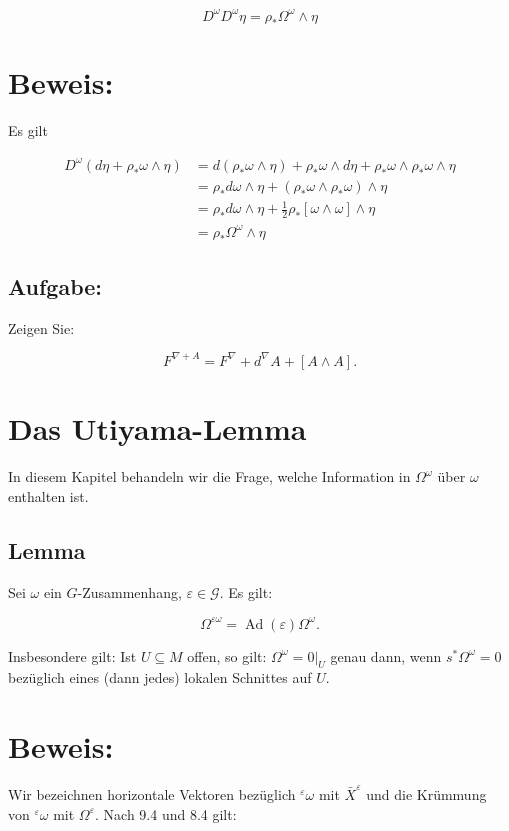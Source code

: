 \documentclass[10pt, letterpaper]{article}
\begin{document}
$$
D^{\omega} D^{\omega} \eta=\rho_{*} \Omega^{\omega} \wedge \eta
$$

\section*{Beweis:}
Es gilt

$$
\begin{aligned}
D^{\omega}\left(d \eta+\rho_{*} \omega \wedge \eta\right) & =d\left(\rho_{*} \omega \wedge \eta\right)+\rho_{*} \omega \wedge d \eta+\rho_{*} \omega \wedge \rho_{*} \omega \wedge \eta \\
& =\rho_{*} d \omega \wedge \eta+\left(\rho_{*} \omega \wedge \rho_{*} \omega\right) \wedge \eta \\
& =\rho_{*} d \omega \wedge \eta+\frac{1}{2} \rho_{*}[\omega \wedge \omega] \wedge \eta \\
& =\rho_{*} \Omega^{\omega} \wedge \eta
\end{aligned}
$$

\subsection*{Aufgabe:}
Zeigen Sie:

$$
F^{\nabla+A}=F^{\nabla}+d^{\nabla} A+[A \wedge A] .
$$

\section*{Das Utiyama-Lemma}
In diesem Kapitel behandeln wir die Frage, welche Information in $\Omega^{\omega}$ über $\omega$ enthalten ist.

\subsection*{Lemma}
Sei $\omega$ ein $G$-Zusammenhang, $\varepsilon \in \mathcal{G}$. Es gilt:

$$
\Omega^{\varepsilon \omega}=\operatorname{Ad}(\varepsilon) \Omega^{\omega} .
$$

Insbesondere gilt: Ist $U \subseteq M$ offen, so gilt: $\Omega^{\omega}=\left.0\right|_{U}$ genau dann, wenn $s^{*} \Omega^{\omega}=0$ bezüglich eines (dann jedes) lokalen Schnittes auf $U$.

\section*{Beweis:}
Wir bezeichnen horizontale Vektoren bezüglich ${ }^{\varepsilon} \omega$ mit $\bar{X}^{\varepsilon}$ und die Krümmung von ${ }^{\varepsilon} \omega$ mit $\Omega^{\varepsilon}$. Nach 9.4 und 8.4 gilt:
\end{document}
